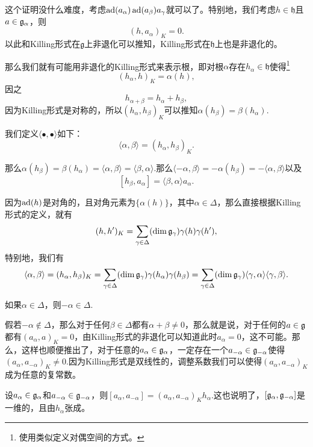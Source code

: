 这个证明没什么难度，考虑$\operatorname{ad}(a_\alpha) \operatorname{ad}(a_\beta) a_\gamma$就可以了。特别地，我们考虑$h\in \mathfrak{h}$且$a\in {\mathfrak{g}}_\alpha$，则
\[
	(h,a_\alpha)_K=0.
\]
以此和Killing形式在$\mathfrak{g}$上非退化可以推知，Killing形式在$\mathfrak{h}$上也是非退化的。

那么我们就有可能用非退化的Killing形式来表示根，即对根$\alpha$存在$h_\alpha\in\mathfrak{h}$使得\footnote{使用类似定义对偶空间的方式。}
\[
	(h_\alpha,h)_K=\alpha(h),
\]
因之
\[
	h_{\alpha+\beta}=h_\alpha+h_\beta,
\]
因为Killing形式是对称的，所以$(h_\alpha,h_\beta)_K$可以推知$\alpha(h_\beta)=\beta(h_\alpha)$.

\para 我们定义$\langle \bullet,\bullet \rangle$如下：
\[
	\langle \alpha,\beta \rangle=(h_\alpha,h_\beta)_K.
\]

那么$\alpha(h_\beta)=\beta(h_\alpha)=\langle \alpha,\beta \rangle=\langle \beta,\alpha \rangle$.那么$\langle -\alpha,\beta \rangle=-\alpha(h_\beta)=-\langle \alpha,\beta \rangle$以及
\[
	[h_\beta,a_\alpha]=\langle \beta,\alpha \rangle a_\alpha.
\]

因为$\operatorname{ad}(h)$是对角的，且对角元素为$\{\alpha(h)\}$，其中$\alpha\in\Delta$，那么直接根据Killing形式的定义，就有
\[
	(h,h')_K=\sum_{\gamma \in \Delta}(\dim {\mathfrak{g}}_\gamma)\gamma(h)\gamma(h'),
\]
特别地，我们有
\[
	\langle \alpha,\beta \rangle=(h_\alpha,h_\beta)_K=\sum_{\gamma \in \Delta}(\dim {\mathfrak{g}}_\gamma)\gamma(h_\alpha)\gamma(h_\beta)=\sum_{\gamma \in \Delta}(\dim {\mathfrak{g}}_\gamma)\langle \gamma,\alpha\rangle\langle \gamma,\beta\rangle.
\]


\pro 如果$\alpha\in\Delta$，则$-\alpha\in\Delta$.

假若$-\alpha\notin\Delta$，那么对于任何$\beta\in\Delta$都有$\alpha+\beta\neq 0$，那么就是说，对于任何的$a\in {\mathfrak{g}}$都有$(a_\alpha,a)_K=0$，由Killing形式的非退化可以知道此时$a_\alpha=0$，这不可能。那么，这样也顺便推出了，对于任意的$a_\alpha\in{\mathfrak{g}}_{\alpha}$，一定存在一个$a_{-\alpha}\in{\mathfrak{g}}_{-\alpha}$使得$(a_\alpha,a_{-\alpha})_K\neq 0$.因为Killing形式是双线性的，调整系数我们可以使得$(a_\alpha,a_{-\alpha})_K$成为任意的复常数。


\pro 设$a_\alpha \in {\mathfrak{g}}_\alpha$和$a_{-\alpha} \in {\mathfrak{g}}_{-\alpha}$，则$[a_{\alpha},a_{-\alpha}]=(a_{\alpha},a_{-\alpha})_Kh_\alpha$.这也说明了，$[{\mathfrak{g}}_{\alpha},{\mathfrak{g}}_{-\alpha}]$是一维的，且由$h_\alpha$张成。


